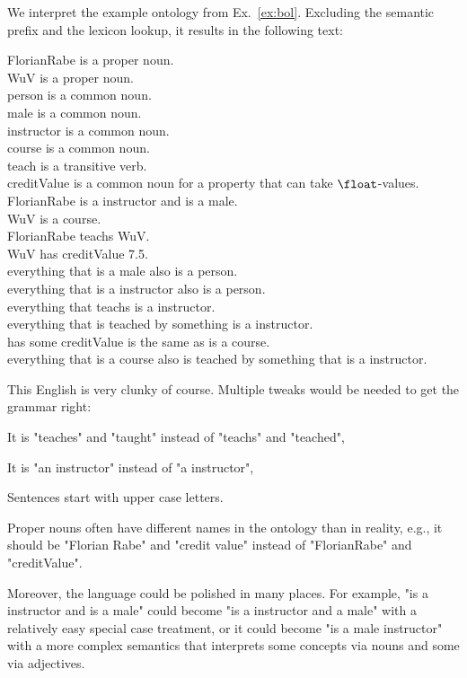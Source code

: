 \begin{example}
We interpret the example ontology from Ex.~\ref{ex:bol}.
Excluding the semantic prefix and the lexicon lookup, it results in the following text:
\medskip

FlorianRabe is a proper noun.\\
WuV is a proper noun.\\
person is a common noun.\\
male is a common noun.\\
instructor is a common noun.\\
course is a common noun.\\
teach is a transitive verb.\\
creditValue is a common noun for a property that can take $\float$-values.\\
FlorianRabe is a instructor and is a male.\\
WuV is a course.\\
FlorianRabe teachs WuV.\\
WuV has creditValue 7.5.\\
everything that is a male also is a person.\\
everything that is a instructor also is a person.\\
everything that teachs is a instructor.\\
everything that is teached by something is a instructor.\\
has some creditValue is the same as is a course.\\
everything that is a course also is teached by something that is a instructor.
\medskip

This English is very clunky of course.
Multiple tweaks would be needed to get the grammar right:
\begin{compactitem}
 \item It is "teaches" and "taught" instead of "teachs" and "teached",
 \item It is "an instructor" instead of "a instructor",
 \item Sentences start with upper case letters.
 \item Proper nouns often have different names in the ontology than in reality, e.g., it should be "Florian Rabe" and "credit value" instead of "FlorianRabe" and "creditValue".
\end{compactitem}
Moreover, the language could be polished in many places.
For example, "is a instructor and is a male" could become "is a instructor and a male" with a relatively easy special case treatment, or it could become "is a male instructor" with a more complex semantics that interprets some concepts via nouns and some via adjectives.
\end{example}

